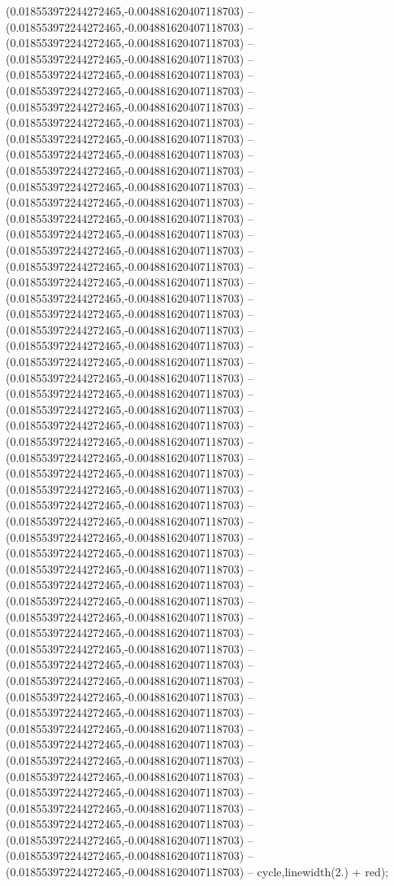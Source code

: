 (0.018553972244272465,-0.004881620407118703) -- (0.018553972244272465,-0.004881620407118703) -- (0.018553972244272465,-0.004881620407118703) -- (0.018553972244272465,-0.004881620407118703) -- (0.018553972244272465,-0.004881620407118703) -- (0.018553972244272465,-0.004881620407118703) -- (0.018553972244272465,-0.004881620407118703) -- (0.018553972244272465,-0.004881620407118703) -- (0.018553972244272465,-0.004881620407118703) -- (0.018553972244272465,-0.004881620407118703) -- (0.018553972244272465,-0.004881620407118703) -- (0.018553972244272465,-0.004881620407118703) -- (0.018553972244272465,-0.004881620407118703) -- (0.018553972244272465,-0.004881620407118703) -- (0.018553972244272465,-0.004881620407118703) -- (0.018553972244272465,-0.004881620407118703) -- (0.018553972244272465,-0.004881620407118703) -- (0.018553972244272465,-0.004881620407118703) -- (0.018553972244272465,-0.004881620407118703) -- (0.018553972244272465,-0.004881620407118703) -- (0.018553972244272465,-0.004881620407118703) -- (0.018553972244272465,-0.004881620407118703) -- (0.018553972244272465,-0.004881620407118703) -- (0.018553972244272465,-0.004881620407118703) -- (0.018553972244272465,-0.004881620407118703) -- (0.018553972244272465,-0.004881620407118703) -- (0.018553972244272465,-0.004881620407118703) -- (0.018553972244272465,-0.004881620407118703) -- (0.018553972244272465,-0.004881620407118703) -- (0.018553972244272465,-0.004881620407118703) -- (0.018553972244272465,-0.004881620407118703) -- (0.018553972244272465,-0.004881620407118703) -- (0.018553972244272465,-0.004881620407118703) -- (0.018553972244272465,-0.004881620407118703) -- (0.018553972244272465,-0.004881620407118703) -- (0.018553972244272465,-0.004881620407118703) -- (0.018553972244272465,-0.004881620407118703) -- (0.018553972244272465,-0.004881620407118703) -- (0.018553972244272465,-0.004881620407118703) -- (0.018553972244272465,-0.004881620407118703) -- (0.018553972244272465,-0.004881620407118703) -- (0.018553972244272465,-0.004881620407118703) -- (0.018553972244272465,-0.004881620407118703) -- (0.018553972244272465,-0.004881620407118703) -- (0.018553972244272465,-0.004881620407118703) -- (0.018553972244272465,-0.004881620407118703) -- (0.018553972244272465,-0.004881620407118703) -- (0.018553972244272465,-0.004881620407118703) -- (0.018553972244272465,-0.004881620407118703) -- (0.018553972244272465,-0.004881620407118703) -- (0.018553972244272465,-0.004881620407118703) -- (0.018553972244272465,-0.004881620407118703) -- (0.018553972244272465,-0.004881620407118703) -- (0.018553972244272465,-0.004881620407118703) -- (0.018553972244272465,-0.004881620407118703) -- cycle,linewidth(2.) + red);

